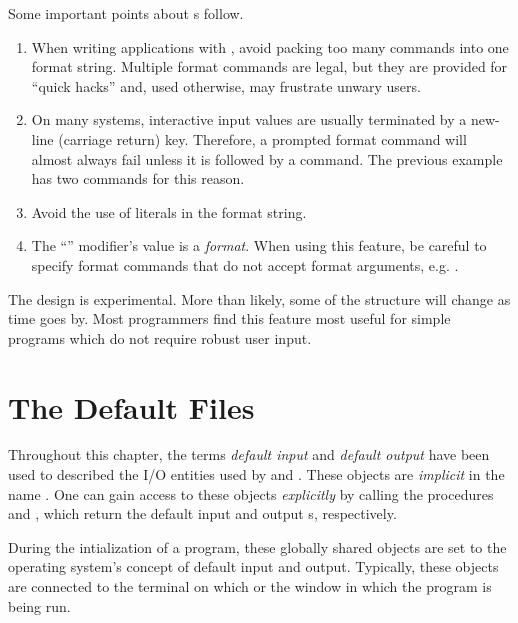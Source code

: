 Some important points about s follow.
\begin{enumerate}
\item
    When writing applications with ,
    avoid packing too many commands into one format string.
    Multiple format commands are legal, but they are provided for
    ``quick hacks'' and, used otherwise, may frustrate unwary users.
\item
    On many systems, interactive input values are usually terminated by
    a new-line (carriage return) key.  Therefore, a prompted format
    command will almost always fail unless it is followed by a
    \code{[NL]} command.  The previous example has two \code{[NL]}
    commands for this reason.
\item
    Avoid the use of literals in the format string.  
\item
    The ``'' modifier's value is a {\em format}.  When using
    this feature, be careful to specify format commands that do not
    accept format arguments, e.g. \code{[NL]}.
\end{enumerate}

The  design is experimental.  More than likely,
some of the structure will change as time goes by.  Most programmers
find this feature most useful for simple programs which do not require
robust user input.


\section{The Default Files}
  

Throughout this chapter, the terms {\em default input} and 
{\em default output} have been used to described the I/O entities
used by  and .  These objects
are {\em implicit} in the name .  One can gain
access to these objects {\em explicitly} by calling the procedures
 and , which
return the default input and output s, 
respectively.


During the intialization of a program, these globally shared
objects are set to the operating system's concept of
default input and output.  Typically, these objects are connected
to the terminal on which or the window in which the program is being run.

